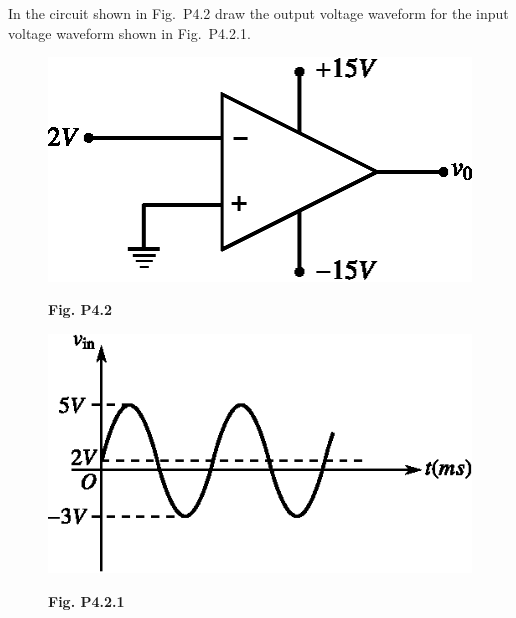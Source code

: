 \begin{problem}\label{prob4.2}
In the circuit shown in Fig.~P4.2 draw the output voltage waveform for the input voltage waveform shown in Fig.~P4.2.1.
\begin{figure}[H]
\centering
\includegraphics{chap4/figP4.1.eps}

\smallskip
{\bf Fig. P4.2}
\end{figure}
\begin{figure}[H]
\centering
\includegraphics{chap4/figP4.2.1.eps}

\smallskip
{\bf Fig. P4.2.1}
\end{figure}
\end{problem}

